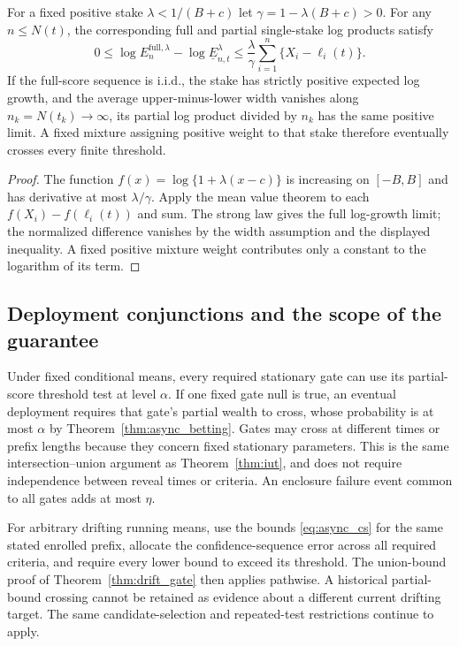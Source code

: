 \begin{proposition}
\label{prop:async_log_penalty}
For a fixed positive stake $\lambda<1/(B+c)$ let
$\gamma=1-\lambda(B+c)>0$. For any $n\leq N(t)$, the corresponding
full and partial single-stake log products satisfy
\[
 0\leq\log E^{\mathrm{full},\lambda}_n
          -\log\underline E^\lambda_{n,t}
 \leq\frac\lambda\gamma
              \sum_{i=1}^n\{X_i-\ell_i(t)\}.
\]
If the full-score sequence is i.i.d., the stake has strictly positive
expected log growth, and the average upper-minus-lower width vanishes
along $n_k=N(t_k)\to\infty$, its partial log product divided by $n_k$
has the same positive limit. A fixed mixture assigning positive weight
to that stake therefore eventually crosses every finite threshold.
\end{proposition}
\begin{proof}
The function $f(x)=\log\{1+\lambda(x-c)\}$ is increasing on $[-B,B]$
and has derivative at most $\lambda/\gamma$. Apply the mean value
theorem to each $f(X_i)-f(\ell_i(t))$ and sum. The strong law gives the
full log-growth limit; the normalized difference vanishes by the width
assumption and the displayed inequality. A fixed positive mixture
weight contributes only a constant to the logarithm of its term.
\end{proof}

\subsection{Deployment conjunctions and the scope of the guarantee}

Under fixed conditional means, every required stationary gate can use
its partial-score threshold test at level $\alpha$. If one fixed gate
null is true, an eventual deployment requires that gate's partial wealth
to cross, whose probability is at most $\alpha$ by
Theorem~\ref{thm:async_betting}. Gates may cross at different times or
prefix lengths because they concern fixed stationary parameters. This
is the same intersection--union argument as Theorem~\ref{thm:iut},
and does not require independence between reveal times or criteria.
An enclosure failure event common to all gates adds at most $\eta$.

For arbitrary drifting running means, use the bounds
\eqref{eq:async_cs} for the same stated enrolled prefix, allocate the
confidence-sequence error across all required criteria, and require
every lower bound to exceed its threshold. The union-bound proof of
Theorem~\ref{thm:drift_gate} then applies pathwise. A historical
partial-bound crossing cannot be retained as evidence about a different
current drifting target. The same candidate-selection and repeated-test
restrictions continue to apply.

